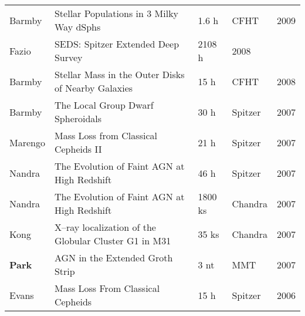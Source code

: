 \begin{tabularx}{\textwidth}{Xp{10cm}XXX}
Barmby & Stellar Populations in 3 Milky Way dSphs &1.6 h & CFHT & 2009\\
Fazio & SEDS: Spitzer Extended Deep Survey & 2108 h & 2008\\
Barmby & Stellar Mass in the Outer Disks of Nearby Galaxies &  15 h & CFHT & 2008\\
Barmby & The Local Group Dwarf Spheroidals  & 30 h & Spitzer& 2007\\  %
Marengo & Mass Loss from Classical Cepheids II & 21 h & Spitzer  & 2007\\ %
Nandra & The Evolution of Faint AGN at High Redshift & 46 h & Spitzer  & 2007\\ %
Nandra & The Evolution of Faint AGN at High Redshift & 1800 ks & Chandra & 2007\\
Kong & X--ray localization of the Globular Cluster G1 in M31 & 35 ks & Chandra & 2007\\
{\bf Park}  & AGN in the Extended Groth Strip & 3 nt & MMT & 2007\\
Evans & Mass Loss From Classical Cepheids  & 15 h & Spitzer  & 2006\\ %

\end{tabularx}
